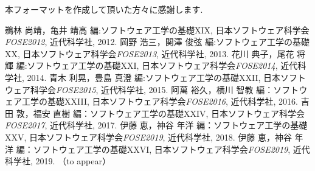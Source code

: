 \documentclass{fose2019}           %
\begin{document}
\acknowledgements{}
本フォーマットを作成して頂いた方々に感謝します.

%


\begin{thebibliography}{9}
 鵜林 尚靖，亀井 靖高 編:ソフトウェア工学の基礎XIX,
         日本ソフトウェア科学会{\em FOSE2012}, 近代科学社, 2012.
 岡野 浩三，関澤 俊弦 編:ソフトウェア工学の基礎XX,
         日本ソフトウェア科学会{\em FOSE2013}, 近代科学社, 2013.
 花川 典子，尾花 将輝 編:ソフトウェア工学の基礎XXI,
         日本ソフトウェア科学会{\em FOSE2014}, 近代科学社, 2014.
  青木 利晃，豊島 真澄 編:ソフトウェア工学の基礎XXII,
         日本ソフトウェア科学会{\em FOSE2015}, 近代科学社, 2015.
  阿萬 裕久，横川 智教 編：ソフトウェア工学の基礎XXIII,
	 日本ソフトウェア科学会{\em FOSE2016}, 近代科学社, 2016.
 吉田 敦，福安 直樹 編：ソフトウェア工学の基礎XXIV,
	 日本ソフトウェア科学会{\em FOSE2017}, 近代科学社, 2017.
 伊藤 恵，神谷 年洋 編：ソフトウェア工学の基礎XXV,
	 日本ソフトウェア科学会{\em FOSE2019}, 近代科学社, 2018. 
 伊藤 恵，神谷 年洋 編：ソフトウェア工学の基礎XXVI,
	 日本ソフトウェア科学会{\em FOSE2019}, 近代科学社, 2019. （to appear）
\end{thebibliography}
\end{document}
